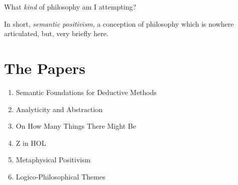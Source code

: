 \documentclass[numreferences]{rbjk}
\begin{document}
\begin{article}
What {\it kind} of philosophy am I attempting?

In short, {\it semantic positivism}, a conception of philosophy which is nowhere articulated, but, very briefly here.

\section{The Papers}

\begin{enumerate}
\item Semantic Foundations for Deductive Methods
\item Analyticity and Abstraction
\item On How Many Things There Might Be
\item Z in HOL
\item Metaphysical Positivism
\item Logico-Philosophical Themes
\end{enumerate}


%

{\raggedright


} %

\end{article}
\end{document}
